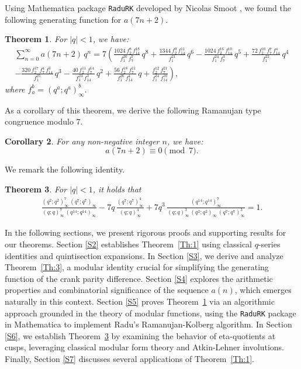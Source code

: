 \documentclass{article}
\newtheorem{theorem}{Theorem}
\newtheorem{corollary}[theorem]{Corollary}
\begin{document}
Using Mathematica package \texttt{RaduRK} developed by Nicolas Smoot \cite{Smoot}, we found the following generating function for $a(7n+2)$. 

\medskip
\begin{theorem}\label{Th:6}
    For $|q|<1$, we have:
    \begin{align*}
        \sum_{n=0}^\infty a(7n+2)\, q^n 
        = 7\left(\frac{1024\,f_2^8\,f_{14}^{18}}{f_1^{20}\,f_7^7}\,q^8 
        +\frac{1344\,f_2^9\,f_{14}^{11}}{f_1^{21}}\,q^6
        -\frac{1024\,f_2^{16}\,f_{14}^{10}}{f_1^{24}\, f_7^3}\,q^5
        +\frac{72\,f_2^{10}\,f_7^7\,f_{14}^4}{f_1^{22}}\,q^4 \right. \\
        \left. -\frac{320\,f_2^{17}\,f_7^4\,f_{14}^3}{f_1^{25}}\,q^3 
        -\frac{40\,f_2^{11}\,f_7^{14}}{f_1^{23}\,f_{14}^3}\,q^2
        +\frac{56\,f_2^{18}\, f_7^{11}}{f_1^{26}\, f_{14}^4}\,q
        +\frac{f_2^{12}\,f_7^{21}}{f_1^{24}\,f_{14}^{10}} \right),
    \end{align*}
    where %
$
f_a^b = (q^a; q^a)_\infty^b.
$
\end{theorem}
\medskip

As a corollary of this theorem, we derive the following Ramanujan type congruence modulo $7$.

\medskip
\begin{corollary} \label{Th:7}
        For any non-negative integer $n$, we have:
        $$a(7n+2) \equiv 0 \pmod 7.$$
\end{corollary}
\medskip

We remark the following identity.

\medskip
\begin{theorem}\label{Th:8}
    For $|q|<1$, it holds that
    \begin{align*}
        \frac{(q^2;q^2)_\infty^7\,(q^7;q^7)_\infty}{(q;q)_\infty^7\,(q^{14};q^{14})_\infty}
        -7q\,\frac{(q^7;q^7)_\infty^4}{(q;q)_\infty^4}
        +7q^3\,\frac{(q^{14};q^{14})_\infty^7}{(q;q)_\infty^3\,(q^2;q^2)_\infty\,(q^7;q^7)_\infty^3}=1.
    \end{align*}
\end{theorem}

\medskip

 In the following sections, we present rigorous proofs and supporting results for our theorems. 
	Section \ref{S2} establishes Theorem~\ref{Th:1} using classical $q$-series identities and quintisection expansions. 
	In Section \ref{S3}, we derive and analyze Theorem~\ref{Th:3}, a modular identity crucial for simplifying the generating function of the crank parity difference. 
	Section \ref{S4} explores the arithmetic properties and combinatorial significance of the sequence $a(n)$, which emerges naturally in this context. 
	Section \ref{S5} proves Theorem~\ref{Th:6} via an algorithmic approach grounded in the theory of modular functions, using the \texttt{RaduRK} package in Mathematica to implement Radu’s Ramanujan-Kolberg algorithm. 
	In Section \ref{S6}, we establish Theorem~\ref{Th:8} by examining the behavior of eta-quotients at cusps, leveraging classical modular form theory and Atkin-Lehner involutions. 
	Finally, Section \ref{S7} discusses several applications of Theorem~\ref{Th:1}.
\end{document}
